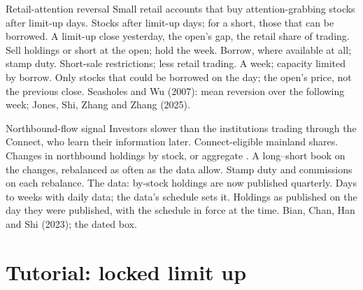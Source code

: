 \begin{strategyfile}{Retail-attention reversal}\label{strat:s1:asia-specific-equity-strategies:retail}
 Small retail accounts that buy attention-grabbing stocks after limit-up days.
 Stocks after limit-up days; for a short, those that can be borrowed.
 A limit-up close yesterday, the open's gap, the retail share of trading.
 Sell holdings or short at the open; hold the week.
 Borrow, where available at all; stamp duty.
 Short-sale restrictions; less retail trading.
 A week; capacity limited by borrow.
 Only stocks that could be borrowed on the day; the open's price, not the previous close.
 Seasholes and Wu (2007): mean reversion over the following week; Jones, Shi, Zhang and Zhang (2025).
\end{strategyfile}

\begin{strategyfile}{Northbound-flow signal}\label{strat:s1:asia-specific-equity-strategies:northbound}
 Investors slower than the institutions trading through the Connect, who learn their information later.
 Connect-eligible mainland shares.
 Changes in northbound holdings by stock, or aggregate .
 A long--short book on the changes, rebalanced as often as the data allow.
 Stamp duty and commissions on each rebalance.
 The data: by-stock holdings are now published quarterly.
 Days to weeks with daily data; the data's schedule sets it.
 Holdings as published on the day they were published, with the schedule in force at the time.
 Bian, Chan, Han and Shi (2023); the dated box.
\end{strategyfile}

\section{Tutorial: locked limit up}\label{tut:s1:asia-specific-equity-strategies:tut}

